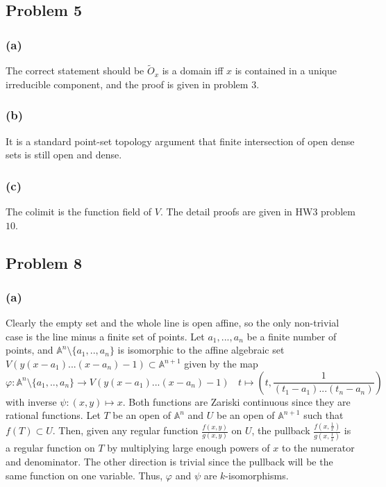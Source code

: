 \documentclass{article}
\theoremstyle{definition}
\theoremstyle{definition}
\theoremstyle{definition}
\theoremstyle{definition}
\theoremstyle{definition}
\theoremstyle{definition}
\theoremstyle{definition}
\begin{document}
\subsection*{Problem 5}
\subsubsection*{(a)}
The correct statement should be $\tilde{O}_x$ is a domain iff $x$ is contained in a unique irreducible component, and the proof is given in problem $3$.
\subsubsection*{(b)}
It is a standard point-set topology argument that finite intersection of open dense sets is still open and dense.

\subsubsection*{(c)}
The colimit is the function field of $V$. The detail proofs are given in HW3 problem $10$.

\subsection*{Problem 8}
\subsubsection*{(a)}
Clearly the empty set and the whole line is open affine, so the only non-trivial case is the line minus a finite set of points. Let $a_1,...,a_n$ be a finite number of points, and $\mathbb{A}^n\setminus \{a_1,..,a_n\}$ is isomorphic to the affine algebraic set $V(y(x-a_1)...(x-a_n)-1)\subset \mathbb{A}^{n+1}$ given by the map 
\[\varphi: \mathbb{A}^n\setminus \{a_1,..,a_n\}\to V(y(x-a_1)...(x-a_n)-1) \ \ \ \ t\mapsto (t,\frac{1}{(t_1-a_1)...(t_n-a_n)})\]
with inverse $\psi: (x,y)\mapsto x$. Both functions are Zariski continuous since they are rational functions. Let $T$ be an open of $\mathbb{A}^n$ and $U$ be an open of $\mathbb{A}^{n+1}$ such that $f(T)\subset U$. Then, given any regular function $\frac{f(x,y)}{g(x,y)}$ on $U$, the pullback $\frac{f(x,\frac{1}{x})}{g(x,\frac{1}{x})}$ is a regular function on $T$ by multiplying large enough powers of $x$ to the numerator and denominator. The other direction is trivial since the pullback will be the same function on one variable. Thus, $\varphi$ and $\psi$ are $k$-isomorphisms. 
\end{document}
